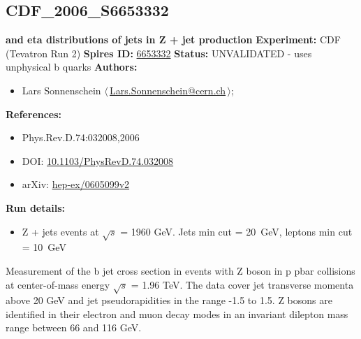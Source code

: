 \subsection[CDF\_2006\_S6653332]{CDF\_2006\_S6653332\,\cite{Abulencia:2006ce}}
\textbf{\pT and eta distributions of jets in Z + jet production}\newline
\textbf{Experiment:} CDF (Tevatron Run 2) \newline
\textbf{Spires ID:} \href{http://www.slac.stanford.edu/spires/find/hep/www?rawcmd=key+6653332}{6653332}\newline
\textbf{Status:} UNVALIDATED - uses unphysical b quarks\newline
\textbf{Authors:}
\begin{itemize}
  \item Lars Sonnenschein $\langle\,$\href{mailto:Lars.Sonnenschein@cern.ch}{Lars.Sonnenschein@cern.ch}$\,\rangle$;
\end{itemize}
\textbf{References:}
\begin{itemize}
  \item Phys.Rev.D.74:032008,2006
  \item DOI: \href{http://dx.doi.org/10.1103/PhysRevD.74.032008}{10.1103/PhysRevD.74.032008}
  \item arXiv: \href{http://arxiv.org/abs/hep-ex/0605099v2}{hep-ex/0605099v2}
\end{itemize}
\textbf{Run details:}
\begin{itemize}

  \item Z + jets events at \ensuremath{\sqrt{s}} = 1960 GeV. Jets min \pT cut = 20~GeV, leptons min \pT cut = 10~GeV\end{itemize}

\noindent Measurement of the b jet cross section in events with Z boson in p pbar collisions at center-of-mass energy \ensuremath{\sqrt{s}} = 1.96 TeV. The data cover jet transverse momenta above 20 GeV and jet pseudorapidities in the range -1.5 to 1.5. Z bosons are identified in their electron and muon decay modes in an invariant dilepton mass range between 66 and 116 GeV.

\clearpage


\clearpage

